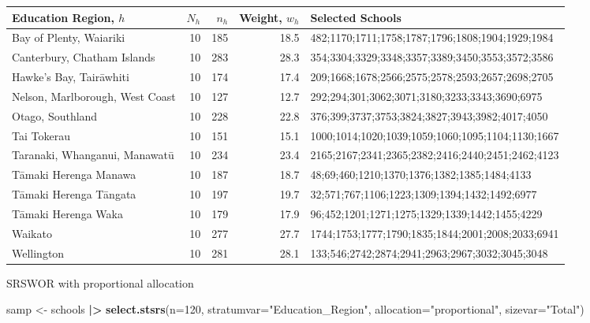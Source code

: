 \documentclass[
]{book}
\newenvironment{Shaded}{\begin{snugshade}}{\end{snugshade}}
\newcommand{\AttributeTok}[1]{\textcolor[rgb]{0.13,0.29,0.53}{#1}}
\newcommand{\DecValTok}[1]{\textcolor[rgb]{0.00,0.00,0.81}{#1}}
\newcommand{\FunctionTok}[1]{\textcolor[rgb]{0.13,0.29,0.53}{\textbf{#1}}}
\newcommand{\NormalTok}[1]{#1}
\newcommand{\OtherTok}[1]{\textcolor[rgb]{0.56,0.35,0.01}{#1}}
\newcommand{\SpecialCharTok}[1]{\textcolor[rgb]{0.81,0.36,0.00}{\textbf{#1}}}
\newcommand{\StringTok}[1]{\textcolor[rgb]{0.31,0.60,0.02}{#1}}
\begin{document}
\begin{table}
\centering
\begin{tabular}[t]{l|r|r|r|l}
\hline
Education Region, $h$ & $N_h$ & $n_h$ & Weight, $w_h$ & Selected Schools\\
\hline
Bay of Plenty, Waiariki & 10 & 185 & 18.5 & 482;1170;1711;1758;1787;1796;1808;1904;1929;1984\\
\hline
Canterbury, Chatham Islands & 10 & 283 & 28.3 & 354;3304;3329;3348;3357;3389;3450;3553;3572;3586\\
\hline
Hawke's Bay, Tairāwhiti & 10 & 174 & 17.4 & 209;1668;1678;2566;2575;2578;2593;2657;2698;2705\\
\hline
Nelson, Marlborough, West Coast & 10 & 127 & 12.7 & 292;294;301;3062;3071;3180;3233;3343;3690;6975\\
\hline
Otago, Southland & 10 & 228 & 22.8 & 376;399;3737;3753;3824;3827;3943;3982;4017;4050\\
\hline
Tai Tokerau & 10 & 151 & 15.1 & 1000;1014;1020;1039;1059;1060;1095;1104;1130;1667\\
\hline
Taranaki, Whanganui, Manawatū & 10 & 234 & 23.4 & 2165;2167;2341;2365;2382;2416;2440;2451;2462;4123\\
\hline
Tāmaki Herenga Manawa & 10 & 187 & 18.7 & 48;69;460;1210;1370;1376;1382;1385;1484;4133\\
\hline
Tāmaki Herenga Tāngata & 10 & 197 & 19.7 & 32;571;767;1106;1223;1309;1394;1432;1492;6977\\
\hline
Tāmaki Herenga Waka & 10 & 179 & 17.9 & 96;452;1201;1271;1275;1329;1339;1442;1455;4229\\
\hline
Waikato & 10 & 277 & 27.7 & 1744;1753;1777;1790;1835;1844;2001;2008;2033;6941\\
\hline
Wellington & 10 & 281 & 28.1 & 133;546;2742;2874;2941;2963;2967;3032;3045;3048\\
\hline
\end{tabular}
\end{table}

SRSWOR with proportional allocation

\begin{Shaded}
\begin{Highlighting}[]
\NormalTok{samp }\OtherTok{\textless{}{-}}\NormalTok{ schools }\SpecialCharTok{|\textgreater{}} \FunctionTok{select.stsrs}\NormalTok{(}\AttributeTok{n=}\DecValTok{120}\NormalTok{, }
                                \AttributeTok{stratumvar=}\StringTok{"Education\_Region"}\NormalTok{, }
                                \AttributeTok{allocation=}\StringTok{"proportional"}\NormalTok{, }\AttributeTok{sizevar=}\StringTok{"Total"}\NormalTok{)}
\end{Highlighting}
\end{Shaded}
\end{document}
